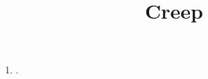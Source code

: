 \documentclass[11pt, oneside]{article}   	%
\title{Creep}
\begin{document}
\maketitle 							%
\date{}							%

\begin{enumerate}

\item .


\end{enumerate}
\end{document}
